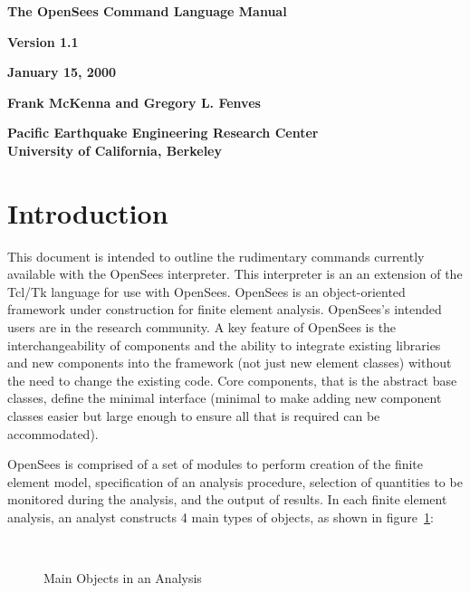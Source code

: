 \documentclass[12pt]{article}
\begin{document}


\begin{center}
{\bf \Large The OpenSees Command Language Manual} 

{\bf Version 1.1} 

{\bf  January 15, 2000} 

{\bf  Frank McKenna and Gregory L. Fenves} 

{\bf  Pacific Earthquake Engineering Research Center \\
      University of California, Berkeley}
\end{center}

\vspace{.2in}
\section{Introduction}
This document is intended to outline the rudimentary commands
currently available with the OpenSees interpreter. This interpreter
is an an extension of the Tcl/Tk language for use with OpenSees. OpenSees 
is an object-oriented framework under construction for 
finite element analysis. OpenSees's intended users are in the research
community. A key feature of OpenSees is the interchangeability of components
and the ability to integrate existing libraries and new components
into the framework (not just new element classes) without the need to
change the existing code. Core components, that is the abstract base
classes, define the minimal interface (minimal to make adding new
component classes easier but large enough to ensure all that is
required can be accommodated). 

OpenSees is comprised of a set of modules to perform creation of the finite 
element model, specification of an analysis procedure, selection
of quantities to be monitored during the analysis, and the output of
results. In each finite element analysis, an analyst constructs 4 main
types of objects, as shown in figure~\ref{main}:


\begin{figure}[htpb]
\begin{center}
\leavevmode
\hbox{%
}
\end{center}
\caption{Main Objects in an Analysis}
\label{main}
\end{figure}
\end{document}
